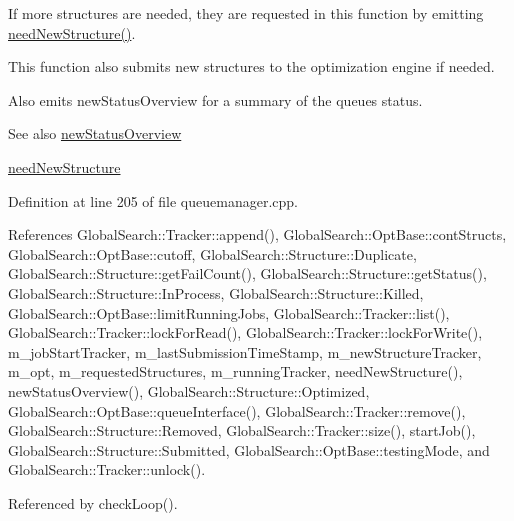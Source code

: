 If more structures are needed, they are requested in this function by emitting \hyperlink{classGlobalSearch_1_1QueueManager_a4b50dbd51e53b1d0d5cb93e9d7380c1c}{need\+New\+Structure()}.

This function also submits new structures to the optimization engine if needed.

Also emits new\+Status\+Overview for a summary of the queue\textquotesingle{}s status.

\begin{DoxySeeAlso}{See also}
\hyperlink{classGlobalSearch_1_1QueueManager_af37eb7a9e54e347a81dc3a1e373c8d54}{new\+Status\+Overview} 

\hyperlink{classGlobalSearch_1_1QueueManager_a4b50dbd51e53b1d0d5cb93e9d7380c1c}{need\+New\+Structure} 
\end{DoxySeeAlso}


Definition at line 205 of file queuemanager.\+cpp.



References Global\+Search\+::\+Tracker\+::append(), Global\+Search\+::\+Opt\+Base\+::cont\+Structs, Global\+Search\+::\+Opt\+Base\+::cutoff, Global\+Search\+::\+Structure\+::\+Duplicate, Global\+Search\+::\+Structure\+::get\+Fail\+Count(), Global\+Search\+::\+Structure\+::get\+Status(), Global\+Search\+::\+Structure\+::\+In\+Process, Global\+Search\+::\+Structure\+::\+Killed, Global\+Search\+::\+Opt\+Base\+::limit\+Running\+Jobs, Global\+Search\+::\+Tracker\+::list(), Global\+Search\+::\+Tracker\+::lock\+For\+Read(), Global\+Search\+::\+Tracker\+::lock\+For\+Write(), m\+\_\+job\+Start\+Tracker, m\+\_\+last\+Submission\+Time\+Stamp, m\+\_\+new\+Structure\+Tracker, m\+\_\+opt, m\+\_\+requested\+Structures, m\+\_\+running\+Tracker, need\+New\+Structure(), new\+Status\+Overview(), Global\+Search\+::\+Structure\+::\+Optimized, Global\+Search\+::\+Opt\+Base\+::queue\+Interface(), Global\+Search\+::\+Tracker\+::remove(), Global\+Search\+::\+Structure\+::\+Removed, Global\+Search\+::\+Tracker\+::size(), start\+Job(), Global\+Search\+::\+Structure\+::\+Submitted, Global\+Search\+::\+Opt\+Base\+::testing\+Mode, and Global\+Search\+::\+Tracker\+::unlock().



Referenced by check\+Loop().

\hypertarget{classGlobalSearch_1_1QueueManager_a2a85ad6729d9e0eb13782699b6cd5ccd}{}
